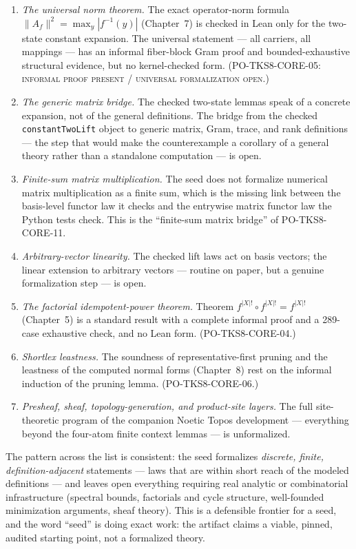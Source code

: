 \begin{enumerate}
\item \emph{The universal norm theorem.} The exact operator-norm formula
      $\lVert A_f\rVert^2 = \max_y |f^{-1}(y)|$ (Chapter~7) is checked
      in Lean only for the two-state constant expansion. The universal
      statement --- all carriers, all mappings --- has an informal
      fiber-block Gram proof and bounded-exhaustive structural evidence,
      but no kernel-checked form. (PO-TKS8-CORE-05: \textsc{informal
      proof present / universal formalization open}.)
\item \emph{The generic matrix bridge.} The checked two-state lemmas
      speak of a concrete expansion, not of the general definitions.
      The bridge from the checked \texttt{constantTwoLift} object to
      generic matrix, Gram, trace, and rank definitions --- the step
      that would make the counterexample a corollary of a general
      theory rather than a standalone computation --- is open.
\item \emph{Finite-sum matrix multiplication.} The seed does not
      formalize numerical matrix multiplication as a finite sum, which
      is the missing link between the basis-level functor law it checks
      and the entrywise matrix functor law the Python tests check.
      This is the ``finite-sum matrix bridge'' of PO-TKS8-CORE-11.
\item \emph{Arbitrary-vector linearity.} The checked lift laws act on
      basis vectors; the linear extension to arbitrary vectors ---
      routine on paper, but a genuine formalization step --- is open.
\item \emph{The factorial idempotent-power theorem.} Theorem
      $f^{|X|!} \circ f^{|X|!} = f^{|X|!}$ (Chapter~5) is a standard
      result with a complete informal proof and a 289-case exhaustive
      check, and no Lean form. (PO-TKS8-CORE-04.)
\item \emph{Shortlex leastness.} The soundness of representative-first
      pruning and the leastness of the computed normal forms
      (Chapter~8) rest on the informal induction of the pruning lemma.
      (PO-TKS8-CORE-06.)
\item \emph{Presheaf, sheaf, topology-generation, and product-site
      layers.} The full site-theoretic program of the companion Noetic
      Topos development --- everything beyond the four-atom finite
      context lemmas --- is unformalized.
\end{enumerate}

The pattern across the list is consistent: the seed formalizes
\emph{discrete, finite, definition-adjacent} statements --- laws that
are within short reach of the modeled definitions --- and leaves open
everything requiring real analytic or combinatorial infrastructure
(spectral bounds, factorials and cycle structure, well-founded
minimization arguments, sheaf theory). This is a defensible frontier
for a seed, and the word ``seed'' is doing exact work: the artifact
claims a viable, pinned, audited starting point, not a formalized
theory.

